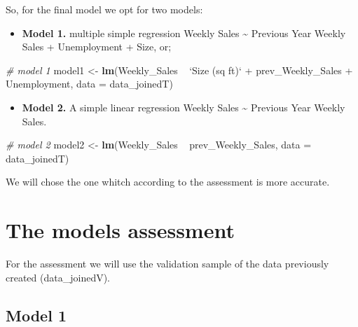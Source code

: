 \documentclass[11pt,]{article}
\newenvironment{Shaded}{\begin{snugshade}}{\end{snugshade}}
\newcommand{\KeywordTok}[1]{\textcolor[rgb]{0.13,0.29,0.53}{\textbf{{#1}}}}
\newcommand{\DataTypeTok}[1]{\textcolor[rgb]{0.13,0.29,0.53}{{#1}}}
\newcommand{\StringTok}[1]{\textcolor[rgb]{0.31,0.60,0.02}{{#1}}}
\newcommand{\CommentTok}[1]{\textcolor[rgb]{0.56,0.35,0.01}{\textit{{#1}}}}
\newcommand{\NormalTok}[1]{{#1}}
\providecommand{\tightlist}{%
  \setlength{\itemsep}{0pt}\setlength{\parskip}{0pt}}
\begin{document}
So, for the final model we opt for two models:

\begin{itemize}
\tightlist
\item
  \textbf{Model 1.} multiple simple regression Weekly Sales
  \textasciitilde{} Previous Year Weekly Sales + Unemployment + Size,
  or;
\end{itemize}

\begin{Shaded}
\begin{Highlighting}[]
\CommentTok{# model 1}
\NormalTok{model1 <-}\StringTok{ }\KeywordTok{lm}\NormalTok{(Weekly_Sales ~}\StringTok{ `}\DataTypeTok{Size (sq ft)}\StringTok{`} \NormalTok{+}\StringTok{ }\NormalTok{prev_Weekly_Sales +}\StringTok{ }
\StringTok{    }\NormalTok{Unemployment, }\DataTypeTok{data =} \NormalTok{data_joinedT)}
\end{Highlighting}
\end{Shaded}

\begin{itemize}
\tightlist
\item
  \textbf{Model 2.} A simple linear regression Weekly Sales
  \textasciitilde{} Previous Year Weekly Sales.
\end{itemize}

\begin{Shaded}
\begin{Highlighting}[]
\CommentTok{# model 2}
\NormalTok{model2 <-}\StringTok{ }\KeywordTok{lm}\NormalTok{(Weekly_Sales ~}\StringTok{ }\NormalTok{prev_Weekly_Sales, }\DataTypeTok{data =} \NormalTok{data_joinedT)}
\end{Highlighting}
\end{Shaded}

We will chose the one whitch according to the assessment is more
accurate.

\section{The models assessment}\label{the-models-assessment}

For the assessment we will use the validation sample of the data
previously created (data\_joinedV).

\subsection{Model 1}\label{model-1}
\end{document}
